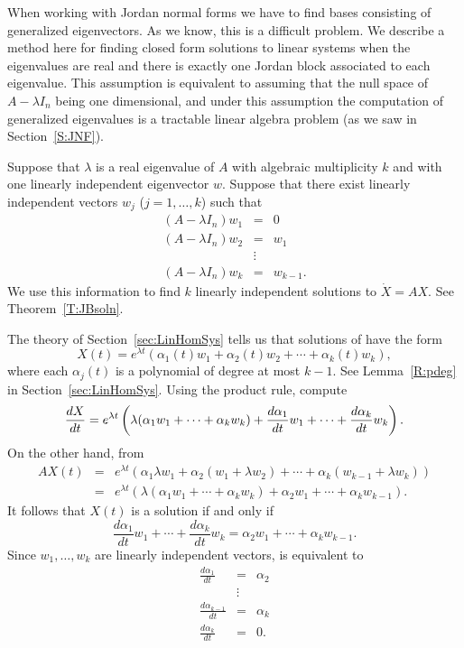 When working with Jordan normal forms we have to 
find bases consisting of generalized eigenvectors.  As we know, this is a 
difficult problem.  We describe a method here for finding closed form 
solutions to linear systems when the eigenvalues are real and there is 
exactly one Jordan block associated to each eigenvalue.  
This assumption is equivalent to assuming that the null space of 
$A-\lambda I_n$ being one dimensional, and under this assumption the 
computation of generalized eigenvalues is a tractable linear algebra problem 
(as we saw in Section~\ref{S:JNF}).

Suppose that $\lambda$ is a real eigenvalue of $A$ with algebraic
multiplicity $k$ and with one linearly independent eigenvector $w$.   Suppose 
that there exist linearly independent vectors $w_j$ ($j=1,\ldots,k$) such that
\begin{equation}  \label{eq:genvec}
\begin{array}{rcl}
(A-\lambda I_n)w_1 & = & 0 \\
(A-\lambda I_n)w_2 & = & w_1 \\
& \vdots & \\
(A-\lambda I_n)w_k & = & w_{k-1}.
\end{array}
\end{equation}
We use this information to find $k$ linearly independent solutions to
$\dot{X}=AX$.  See Theorem~\ref{T:JBsoln}.

The theory of Section~\ref{sec:LinHomSys} tells us that solutions of
 have the form
\[
X(t)=e^{\lambda t}(\alpha_1(t)w_1+\alpha_2(t)w_2+\cdots+\alpha_k(t)w_k),
\]
where each $\alpha_j(t)$ is a polynomial of degree at most $k-1$.  See 
Lemma~\ref{R:pdeg} in Section~\ref{sec:LinHomSys}.  Using the product rule, 
compute
\[
\displaystyle\frac{dX}{dt} = e^{\lambda t}
\left(\lambda (\alpha_1w_1+\cdots+\alpha_kw_k)+
\frac{d\alpha_1}{dt}w_1+\cdots+\frac{d\alpha_k}{dt}w_k\right).
\]
On the other hand, from 
\begin{eqnarray*}
AX(t) & = & e^{\lambda t}(\alpha_1\lambda w_1+\alpha_2(w_1+\lambda w_2)
+\cdots+\alpha_k(w_{k-1}+\lambda w_k))\\
& = & e^{\lambda t}(\lambda (\alpha_1w_1+\cdots+\alpha_kw_k) +
\alpha_2w_1 + \cdots+ \alpha_kw_{k-1}).
\end{eqnarray*}
It follows that $X(t)$ is a solution if and only if
\begin{equation}  \label{E:alphas}
\frac{d\alpha_1}{dt}w_1+\cdots+
\frac{d\alpha_k}{dt}w_k= \alpha_2w_1 + \cdots+ \alpha_kw_{k-1}.
\end{equation}
Since $w_1,\ldots,w_k$ are linearly independent vectors,  is 
equivalent to
\begin{eqnarray*}
\frac{d\alpha_1}{dt} & = & \alpha_2    \\
                     & \vdots &        \\
\frac{d\alpha_{k-1}}{dt} & = & \alpha_k \\
\frac{d\alpha_k}{dt}  & = & 0.
\end{eqnarray*}

